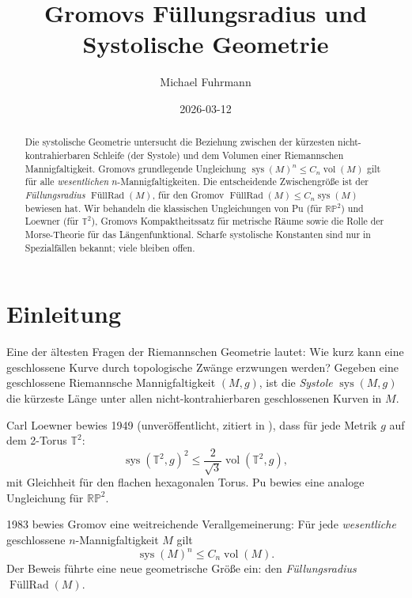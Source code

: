 \documentclass[12pt,a4paper]{amsart}
\theoremstyle{definition}
\theoremstyle{remark}
\DeclareMathOperator{\sys}{sys}
\DeclareMathOperator{\FillRad}{FüllRad}
\DeclareMathOperator{\vol}{vol}
\newcommand{\RP}{\mathbb{RP}}
\newcommand{\TT}{\mathbb{T}}
\begin{document}
\begin{abstract}
Die systolische Geometrie untersucht die Beziehung zwischen der kürzesten
nicht-kontrahierbaren Schleife (der Systole) und dem Volumen einer
Riemannschen Mannigfaltigkeit.
Gromovs grundlegende Ungleichung $\sys(M)^n \le C_n \vol(M)$ gilt für alle
\emph{wesentlichen} $n$-Mannigfaltigkeiten.
Die entscheidende Zwischengröße ist der \emph{Füllungsradius} $\FillRad(M)$,
für den Gromov $\FillRad(M) \le C_n \sys(M)$ bewiesen hat.
Wir behandeln die klassischen Ungleichungen von Pu (für $\RP^2$) und Loewner
(für $\TT^2$), Gromovs Kompaktheits\-satz für metrische Räume sowie die
Rolle der Morse-Theorie für das Längenfunktional.
Scharfe systolische Konstanten sind nur in Spezialfällen bekannt;
viele bleiben offen.
\end{abstract}

\title{Gromovs Füllungsradius und Systolische Geometrie}

\author{Michael Fuhrmann}
\address{Specialist Mathematics Project, Build 169}
\date{2026-03-12}

\maketitle
\tableofcontents

\section{Einleitung}

Eine der ältesten Fragen der Riemannschen Geometrie lautet: Wie kurz kann
eine geschlossene Kurve durch topologische Zwänge erzwungen werden?
Gegeben eine geschlossene Riemannsche Mannigfaltigkeit $(M,g)$, ist die
\emph{Systole} $\sys(M,g)$ die kürzeste Länge unter allen nicht-kontrahierbaren
geschlossenen Kurven in $M$.

Carl Loewner bewies 1949 (unveröffentlicht, zitiert in \cite{Pu1952}),
dass für jede Metrik $g$ auf dem 2-Torus $\TT^2$:
\[
  \sys(\TT^2, g)^2 \le \frac{2}{\sqrt{3}} \vol(\TT^2, g),
\]
mit Gleichheit für den flachen hexagonalen Torus.  Pu \cite{Pu1952} bewies
eine analoge Ungleichung für $\RP^2$.

1983 bewies Gromov \cite{Gromov1983} eine weitreichende Verallgemeinerung:
Für jede \emph{wesentliche} geschlossene $n$-Mannigfaltigkeit $M$ gilt
\[
  \sys(M)^n \le C_n \vol(M).
\]
Der Beweis führte eine neue geometrische Größe ein: den \emph{Füllungsradius}
$\FillRad(M)$.
\end{document}
